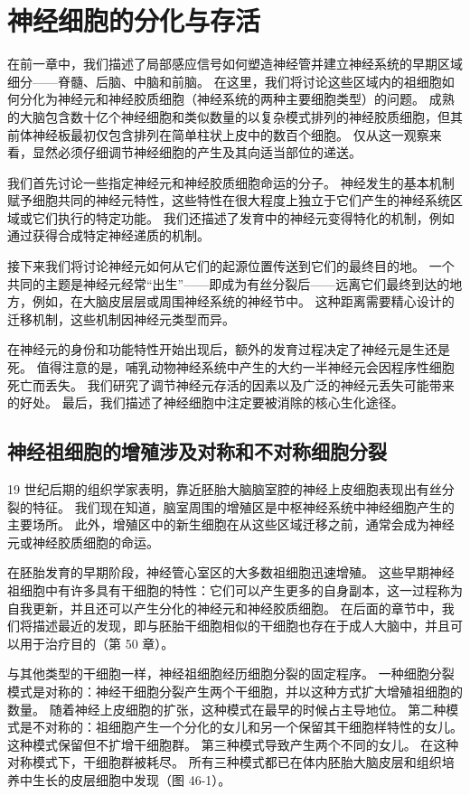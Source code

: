 \chapter{神经细胞的分化与存活} \label{chap:chap46}
在前一章中，我们描述了局部感应信号如何塑造神经管并建立神经系统的早期区域细分——脊髓、后脑、中脑和前脑。 在这里，我们将讨论这些区域内的祖细胞如何分化为神经元和神经胶质细胞（神经系统的两种主要细胞类型）的问题。 成熟的大脑包含数十亿个神经细胞和类似数量的以复杂模式排列的神经胶质细胞，但其前体神经板最初仅包含排列在简单柱状上皮中的数百个细胞。 仅从这一观察来看，显然必须仔细调节神经细胞的产生及其向适当部位的递送。

我们首先讨论一些指定神经元和神经胶质细胞命运的分子。 神经发生的基本机制赋予细胞共同的神经元特性，这些特性在很大程度上独立于它们产生的神经系统区域或它们执行的特定功能。 我们还描述了发育中的神经元变得特化的机制，例如通过获得合成特定神经递质的机制。

接下来我们将讨论神经元如何从它们的起源位置传送到它们的最终目的地。 一个共同的主题是神经元经常“出生”——即成为有丝分裂后——远离它们最终到达的地方，例如，在大脑皮层层或周围神经系统的神经节中。 这种距离需要精心设计的迁移机制，这些机制因神经元类型而异。

在神经元的身份和功能特性开始出现后，额外的发育过程决定了神经元是生还是死。 值得注意的是，哺乳动物神经系统中产生的大约一半神经元会因程序性细胞死亡而丢失。 我们研究了调节神经元存活的因素以及广泛的神经元丢失可能带来的好处。 最后，我们描述了神经细胞中注定要被消除的核心生化途径。

\section{神经祖细胞的增殖涉及对称和不对称细胞分裂}
19 世纪后期的组织学家表明，靠近胚胎大脑脑室腔的神经上皮细胞表现出有丝分裂的特征。 我们现在知道，脑室周围的增殖区是中枢神经系统中神经细胞产生的主要场所。 此外，增殖区中的新生细胞在从这些区域迁移之前，通常会成为神经元或神经胶质细胞的命运。

在胚胎发育的早期阶段，神经管心室区的大多数祖细胞迅速增殖。 这些早期神经祖细胞中有许多具有干细胞的特性：它们可以产生更多的自身副本，这一过程称为自我更新，并且还可以产生分化的神经元和神经胶质细胞。 在后面的章节中，我们将描述最近的发现，即与胚胎干细胞相似的干细胞也存在于成人大脑中，并且可以用于治疗目的（第 50 章）。

与其他类型的干细胞一样，神经祖细胞经历细胞分裂的固定程序。 一种细胞分裂模式是对称的：神经干细胞分裂产生两个干细胞，并以这种方式扩大增殖祖细胞的数量。 随着神经上皮细胞的扩张，这种模式在最早的时候占主导地位。 第二种模式是不对称的：祖细胞产生一个分化的女儿和另一个保留其干细胞样特性的女儿。 这种模式保留但不扩增干细胞群。 第三种模式导致产生两个不同的女儿。 在这种对称模式下，干细胞群被耗尽。 所有三种模式都已在体内胚胎大脑皮层和组织培养中生长的皮层细胞中发现（图 46-1）。

